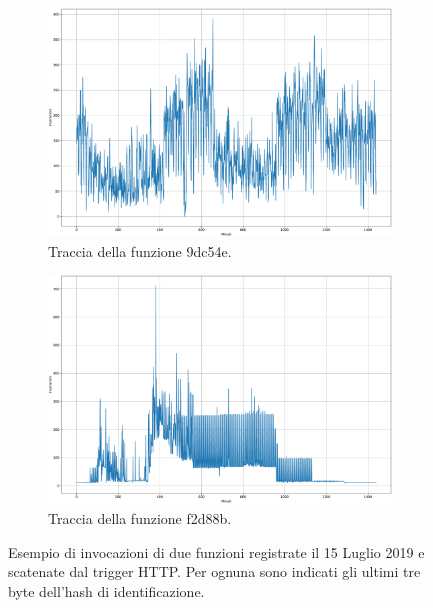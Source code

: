 \begin{figure}
    \centering

    \begin{subfigure}{.95\textwidth}
        \centering
        \includegraphics[width=\linewidth]{assets/5/requests_9dc54e.pdf}
        \caption{Traccia della funzione 9dc54e.}
        \label{fig:5_real_traces_9dc54e}
    \end{subfigure}

    \begin{subfigure}{.95\textwidth}
        \centering
        \includegraphics[width=\linewidth]{assets/5/requests_f2d88b.pdf}
        \caption{Traccia della funzione f2d88b.}
        \label{fig:5_real_traces_f2d88b}
    \end{subfigure}
    
    \caption[Esempio di invocazioni di due funzioni dal set di dati reale]{Esempio di invocazioni di due funzioni registrate il 15 Luglio 2019 e scatenate dal trigger HTTP. Per ognuna sono indicati gli ultimi tre byte dell'hash di identificazione.}
    \label{fig:5_real_traces}
\end{figure}

